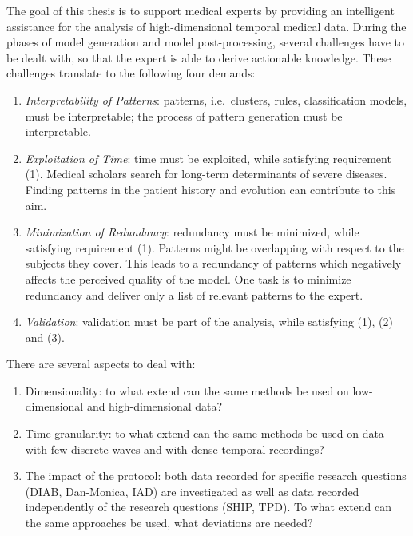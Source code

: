 \documentclass[
]{book}
\providecommand{\tightlist}{%
  \setlength{\itemsep}{0pt}\setlength{\parskip}{0pt}}
\begin{document}
The goal of this thesis is to support medical experts by providing an intelligent assistance for the analysis of high-dimensional temporal medical data.
During the phases of model generation and model post-processing, several challenges have to be dealt with, so that the expert is able to derive actionable knowledge. These challenges translate to the following four demands:

\begin{enumerate}
\def\labelenumi{(\arabic{enumi})}
\tightlist
\item
  \emph{Interpretability of Patterns}: patterns, i.e.~clusters, rules, classification models, must be interpretable; the process of pattern generation must be interpretable.
\item
  \emph{Exploitation of Time}: time must be exploited, while satisfying requirement (1).
  Medical scholars search for long-term determinants of severe diseases. Finding patterns in the patient history and evolution can contribute to this aim.
\item
  \emph{Minimization of Redundancy}: redundancy must be minimized, while satisfying requirement (1). Patterns might be overlapping with respect to the subjects they cover. This leads to a redundancy of patterns which negatively affects the perceived quality of the model. One task is to minimize redundancy and deliver only a list of relevant patterns to the expert.
\item
  \emph{Validation}: validation must be part of the analysis, while satisfying (1), (2) and (3).
\end{enumerate}

There are several aspects to deal with:

\begin{enumerate}
\def\labelenumi{\arabic{enumi}.}
\tightlist
\item
  Dimensionality: to what extend can the same methods be used on low-dimensional and high-dimensional data?
\item
  Time granularity: to what extend can the same methods be used on data with few discrete waves and with dense temporal recordings?
\item
  The impact of the protocol: both data recorded for specific research questions (DIAB, Dan-Monica, IAD) are investigated as well as data recorded independently of the research questions (SHIP, TPD). To what extend can the same approaches be used, what deviations are needed?
\end{enumerate}
\end{document}
